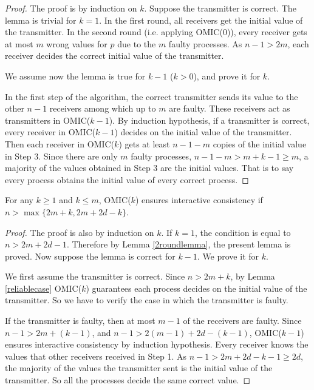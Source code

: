 \begin{proof}
  The proof is by induction on $k$. Suppose the transmitter is correct. The
  lemma is trivial for $k=1$.
In the first round, all receivers get the initial value of the transmitter. In the second
  round (i.e. applying OMIC($0$)), every receiver gets at most $m$ wrong
  values for $p$ due to the $m$ faulty processes.
 As $n-1>2m$, each
  receiver decides the correct initial value of the transmitter.

  We assume now the
  lemma is true for $k-1$ ($k>0$), and prove it for $k$.
  
 

  In the first step of the algorithm, the correct transmitter sends its value
  to the other $n-1$ receivers among which up to $m$ are faulty. 
  These receivers act as transmitters in OMIC($k-1$). 
  By induction hypothesis, if a transmitter is correct, every receiver in OMIC($k-1$)
  decides on the initial value of the transmitter.
  Then each receiver in OMIC($k$)  gets at least $n-1-m$ copies of the
  initial value in Step $3$. Since there are only $m$ faulty processes,
  $n-1-m>m+k-1 \geqslant m$, a majority of the values obtained  in Step $3$
  are the initial values. That is to say every process obtains the initial
  value of every correct process.
\end{proof}

\begin{lemma}\label{coreLemma}
  \label{mainlemma}For any $k \geqslant 1$ and $k \leqslant m$, OMIC($k$) ensures
  interactive consistency if $n>\max\{2m+k,2m+2d-k\}$.
\end{lemma}

\begin{proof}
  The proof is also by induction on $k$. If $k=1$, the condition is equal to $n>2m+2d-1$.
  Therefore by Lemma \ref{2roundlemma}, the present lemma is proved.
  Now suppose
  the lemma is correct for $k-1$. We prove it for $k$.
  
  We first assume the transmitter is correct. Since $n>2m+k$, by Lemma
  \ref{reliablecase} OMIC($k$) guarantees each process decides on  the initial
  value of the transmitter. So we have to verify the case in which
  the transmitter is faulty.
  
  If the transmitter is faulty, then at most $m-1$ of the receivers are
  faulty. Since $n-1>2m+ ( k-1 )$, and $n-1>2 ( m-1 ) +2d- (
  k-1 )$, OMIC($k-1$) ensures interactive consistency by induction hypothesis.
  Every receiver  knows the values that other receivers received in Step 1. As
  $n-1>2m+2d-k-1 \geqslant 2d$, the majority of the values the transmitter
  sent is the initial value of the transmitter. So all the processes decide
  the same correct value.
\end{proof}



